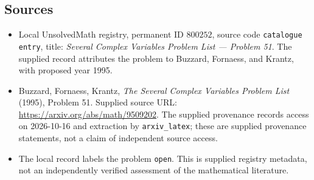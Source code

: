 \documentclass[11pt]{article}
\begin{document}
\subsection{Sources}
\begin{itemize}
\item Local UnsolvedMath registry, permanent ID \(800252\), source code \texttt{catalogue entry}, title: \emph{Several Complex Variables Problem List --- Problem 51}. The supplied record attributes the problem to Buzzard, Fornaess, and Krantz, with proposed year 1995.
\item Buzzard, Fornaess, Krantz, \emph{The Several Complex Variables Problem List} (1995), Problem 51. Supplied source URL: \url{https://arxiv.org/abs/math/9509202}. The supplied provenance records access on 2026-10-16 and extraction by \texttt{arxiv\_latex}; these are supplied provenance statements, not a claim of independent source access.
\item The local record labels the problem \texttt{open}. This is supplied registry metadata, not an independently verified assessment of the mathematical literature.
\end{itemize}
\end{document}
